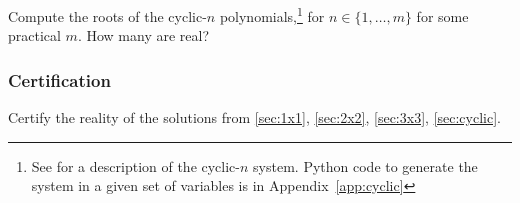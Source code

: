 \documentclass[letter,portrait]{article}
\newcommand{\1}{{\tt \_1}}
\newcommand{\2}{{\tt \_2}}
\newcommand{\tools}[1]{{\em suggested tools:} {\tt #1}}
\begin{document}



Compute the roots of the cyclic-$n$ polynomials,\footnote{See \cite{dai2003computing} for a description of the cyclic-$n$ system.  Python code to generate the system in a given set of variables is in Appendix~\ref{app:cyclic}} for $n \in \{1, \ldots, m\}$ for some practical $m$.  How many are real?  


















\subsubsection{Certification}
\label{sec:certification}

Certify the reality of the solutions from \ref{sec:1x1}, \ref{sec:2x2}, \ref{sec:3x3}, \ref{sec:cyclic}.










\end{document}
